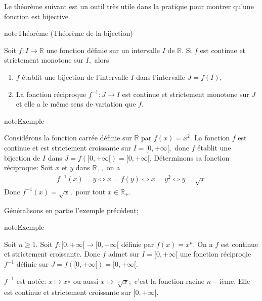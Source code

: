 \documentclass[letterpaper,10pt,french]{jupyterBook}
\begin{document}
\sphinxAtStartPar
Le théorème suivant est un outil très utile dans la pratique pour montrer qu’une fonction est bijective.

\begin{sphinxadmonition}{note}{Théorème (Théorème de la bijection)}

\sphinxAtStartPar
Soit \(f:I\rightarrow\mathbb{R}\) une fonction définie sur un intervalle \(I\) de \(\mathbb{R}.\) Si \(f\) est continue et strictement monotone sur \(I,\) alors
\begin{enumerate}
%
\item {} 
\sphinxAtStartPar
\(f\) établit une bijection de l’intervalle \(I\) dans l’intervalle \(J=f(I),\)

\item {} 
\sphinxAtStartPar
La fonction réciproque \(f^{-1}:J\rightarrow I\) est continue et strictement monotone sur \(J\) et elle a le même sens de variation que \(f.\)

\end{enumerate}
\end{sphinxadmonition}

\begin{sphinxadmonition}{note}{Exemple}

\sphinxAtStartPar
Considérons la fonction carrée définie sur \(\mathbb{R}\) par \(f(x)=x^2.\) La fonction \(f\) est continue et est strictement croissante sur \(I=[0,+\infty[,\) donc \(f\) établit une bijection de \(I\) dans \(J=f([0,+\infty[)=[0,+\infty[.\) Déterminons sa fonction réciproque: Soit \(x\) et \(y\) dans \(\mathbb{R}_{+},\) on a
\begin{equation*}
\begin{split}
f^{-1}(x)=y\Leftrightarrow x=f(y)\Leftrightarrow x=y^2 \Leftrightarrow y=\sqrt{x}
\end{split}
\end{equation*}
\sphinxAtStartPar
Donc \(f^{-1}(x)=\sqrt{x},\) pour tout \(x\in \mathbb{R}_{+}.\)
\end{sphinxadmonition}

\sphinxAtStartPar
Généralisons en partie l’exemple précédent;

\begin{sphinxadmonition}{note}{Exemple}

\sphinxAtStartPar
Soit \(n\geq 1.\) Soit \(f:[0,+\infty[\rightarrow [0,+\infty[\) définie par \(f(x)=x^n.\) On a \(f\) est continue et strictement croissante. Donc \(f\) admet sur \(I=[0,+\infty[\) une fonction réciproqie \(f^{-1}\) définie sur \(J=f([0,+\infty[)=[0,+\infty[.\)

\sphinxAtStartPar
\(f^{-1}\) est notée: \(x\mapsto x^{\frac{1}{n}}\) ou aussi \(x\mapsto \sqrt[n]{x};\) c’est la fonction racine \(n-\)ième. Elle est continue et strictement croissante sur \([0,+\infty[.\)
\end{sphinxadmonition}
\end{document}

